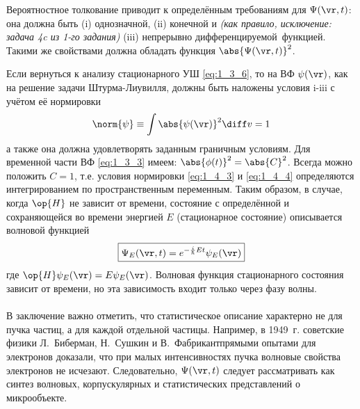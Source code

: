 Вероятностное толкование приводит к определённым требованиям для $\Psi(\vr,t)$: она должна быть (i) однозначной, (ii) конечной и \textit{(как правило, исключение: задача 4c из 1-го задания)} (iii) непрерывно дифференцируемой{\footnotemark}~функцией. Такими же свойствами должна обладать функция $\abs{\Psi(\vr,t)}^2$.


Если вернуться к анализу стационарного УШ \eqref{eq:1_3_6}, то на ВФ $\psi(\vr)$, как на решение задачи Штурма-Лиувилля, должны быть наложены условия i-iii с учётом её нормировки
\begin{equation}
\label{eq:1_4_4}
\norm{\psi} \equiv \int \abs{\psi(\vr)}^2 \diff v = 1
\end{equation}%
%
а также она должна удовлетворять заданным граничным условиям. Для временной части ВФ \eqref{eq:1_3_3} имеем: $\abs{\phi (t)}^2= \abs{C}^2$. Всегда можно положить $C = 1$, т.е. условия нормировки \eqref{eq:1_4_3} и \eqref{eq:1_4_4} определяются интегрированием по пространственным переменным. Таким образом, в случае, когда $\op{H}$ не зависит от времени, состояние с определённой и сохраняющейся во времени энергией $E$ (стационарное состояние) описывается волновой функцией
$$
\boxed{
  \Psi_E(\vr,t) = e^{-\frac{i}{\hbar}Et} \psi_E(\vr)
}
$$ где $\op{H} \psi_E(\vr) = E\psi_E(\vr)$. Волновая функция стационарного состояния зависит от времени, но эта зависимость входит только через фазу волны.
\\
\\

В заключение важно отметить, что статистическое описание характерно не для пучка частиц, а для каждой отдельной частицы. Например, в 1949~г. советские физики Л.~Биберман, Н.~Сушкин и В.~Фабрикант\footnotemark прямыми опытами для электронов доказали, что при малых интенсивностях пучка волновые свойства электронов не исчезают. Следовательно, $\Psi(\vr,t)$ следует рассматривать как синтез волновых, корпускулярных и статистических представлений о микрообъекте.
